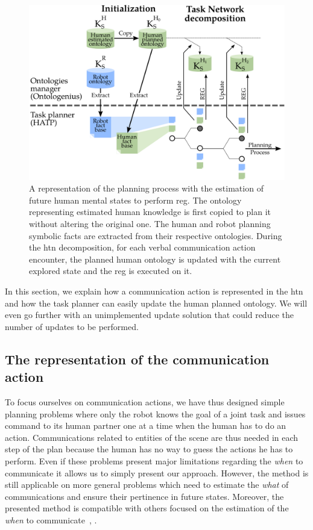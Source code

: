 \begin{figure}[!ht]
\centering
\includegraphics[scale=0.4]{figures/chapter5/integration.png}
\caption{\label{fig:chap5_integration} A representation of the planning process with the estimation of future human mental states to perform \acrshort{reg}. The ontology representing estimated human knowledge is first copied to plan it without altering the original one. The human and robot planning symbolic facts are extracted from their respective ontologies. During the \acrshort{htn} decomposition, for each verbal communication action encounter, the planned human ontology is updated with the current explored state and the \acrshort{reg} is executed on it. }
\end{figure}

In this section, we explain how a communication action is represented in the \acrshort{htn} and how the task planner can easily update the human planned ontology. We will even go further with an unimplemented update solution that could reduce the number of updates to be performed. 


\subsection{The representation of the communication action}

To focus ourselves on communication actions, we have thus designed simple planning problems where only the robot knows the goal of a joint task and issues command to its human partner one at a time when the human has to do an action. Communications related to entities of the scene are thus needed in each step of the plan because the human has no way to guess the actions he has to perform. Even if these problems present major limitations regarding the \textit{when} to communicate it allows us to simply present our approach. However, the method is still applicable on more general problems which need to estimate the \textit{what} of communications and ensure their pertinence in future states. Moreover, the presented method is compatible with others focused on the estimation of the \textit{when} to communicate~\cite{devin_2016_implemented}, \cite{unhelkar_2020_decision}.

